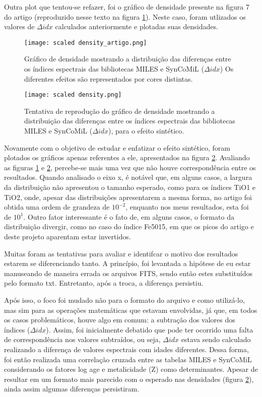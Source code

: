 \documentclass[12pt]{projeto}
\begin{document}
Outra plot que tentou-se refazer, foi o gráfico de densidade presente na figura 7 do artigo (reproduzido nesse texto na figura \ref{fig:scaled_density_artigo}). Neste caso, foram utlizados os valores de \(\Delta idx\) calculados anteriormente e plotadas suas densidades.


 \begin{figure}[h]
\centering
\texttt{[image: scaled density\_artigo.png]}
\caption{\label{fig:scaled_density_artigo} Gráfico de densidade mostrando a distribuição das diferenças entre os índices espectrais das bibliotecas MILES e SynCoMiL (\(\Delta idx\)) Os diferentes efeitos são representados por cores distintas.}
\end{figure}

 \begin{figure}[h]
\centering
\texttt{[image: scaled density.png]}
\caption{\label{fig:scaled_density} Tentativa de reprodução do gráfico de densidade mostrando a distribuição das diferenças entre os índices espectrais das bibliotecas MILES e SynCoMiL (\(\Delta idx\)), para o efeito sintético.}
\end{figure}

Novamente com o objetivo de estudar e enfatizar o efeito sintético, foram plotados os gráficos apenas referentes a ele, apresentados na figura \ref{fig:scaled_density}.
Avaliando as figuras \ref{fig:scaled_density_artigo} e \ref{fig:scaled_density}, percebe-se mais uma vez que não houve correspondência entre os resultados. Quando analisado o eixo x, é notável que, em alguns casos, a largura da distribuição não apresentou o tamanho esperado, como para os índices TiO1 e TiO2, onde, apesar das distribuições apresentarem a mesma forma, no artigo foi obtida uma ordem de grandeza de \(10^{-2}\), enquanto nos meus resultados, esta foi de \(10^1\). Outro fator interessante é o fato de, em alguns casos, o formato da distribuição divergir, como no caso do índice Fe5015, em que os picos do artigo e deste projeto aparentam estar invertidos. 

Muitas foram as tentativas para avaliar e identifcar o motivo dos resultados estarem se diferenciando tanto. A princípio, foi levantada a hipótese de eu estar manuseando de maneira errada os arquivos FITS, sendo então estes substituídos pelo formato txt. Entretanto, após a troca, a diferença persistiu.

Após isso, o foco foi mudado não para o formato do arquivo e como utilizá-lo, mas sim para as operações matemáticas que estavam envolvidas, já que, em todos os casos problemáticos, houve algo em comum: a subtração dos valores dos índices (\(\Delta idx\)). Assim, foi inicialmente debatido que pode ter ocorrido uma falta de correspondência nos valores subtraídos, ou seja, \(\Delta idx\) estava sendo calculado realizando a diferença de valores espectrais com idades diferentes. Dessa forma, foi então realizada uma correlação cruzada entre as tabelas MILES e SynCoMiL considerando os fatores log age e metalicidade (Z) como determinantes. Apesar de resultar em um formato mais parecido com o esperado nas densidades (figura \ref{fig:scaled_density}), ainda assim algumas diferenças persistiram.
\end{document}
